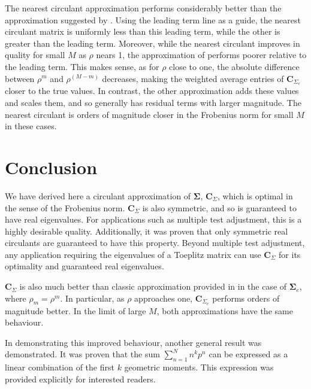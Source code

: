 \documentclass[letterpaper,12pt,oneside,final]{article}
\newcommand{\m}[1]{\mathbf{#1}}               %
\newcommand{\sm}[1]{\boldsymbol{#1}}   %
\begin{document}
The nearest circulant approximation performs considerably better than the approximation suggested by \cite{gray2006toeplitz}. Using the leading term line as a guide, the nearest circulant matrix is uniformly less than this leading term, while the other is greater than the leading term. Moreover, while the nearest circulant improves in quality for small $M$ as $\rho$ nears 1, the approximation of \cite{gray2006toeplitz} performs poorer relative to the leading term. This makes sense, as for $\rho$ close to one, the absolute difference between $\rho^m$ and $\rho^{(M-m)}$ decreases, making the weighted average entries of $\m{C}_{\Sigma_e}$ closer to the true values. In contrast, the other approximation adds these values and scales them, and so generally has residual terms with larger magnitude. The nearest circulant is orders of magnitude closer in the Frobenius norm for small $M$ in these cases.

\section{Conclusion} \label{sec:conc}

We have derived here a circulant approximation of $\sm{\Sigma}$, $\m{C}_{\Sigma}$, which is optimal in the sense of the Frobenius norm. $\m{C}_{\Sigma}$ is also symmetric, and so is guaranteed to have real eigenvalues. For applications such as multiple test adjustment, this is a highly desirable quality. Additionally, it was proven that only symmetric real circulants are guaranteed to have this property. Beyond multiple test adjustment, any application requiring the eigenvalues of a Toeplitz matrix can use $\m{C}_{\Sigma}$ for its optimality and guaranteed real eigenvalues.

$\m{C}_{\Sigma}$ is also much better than classic approximation provided in \cite{grenanderszego1958} in the case of $\sm{\Sigma}_e$, where $\rho_m = \rho^m$. In particular, as $\rho$ approaches one, $\m{C}_{\Sigma_e}$ performs orders of magnitude better. In the limit of large $M$, both approximations have the same behaviour.

In demonstrating this improved behaviour, another general result was demonstrated. It was proven that the sum $\sum_{n = 1}^{N} n^k p^n$ can be expressed as a linear combination of the first $k$ geometric moments. This expression was provided explicitly for interested readers.



\end{document}
